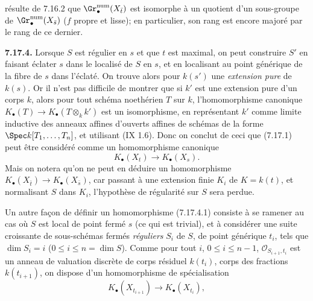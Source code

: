 résulte de 7.16.2 que \(\Gr_\bullet^{\mathrm{num}}(X_{\bar t})\) est isomorphe à un quotient d'un sous-groupe de \(\Gr_\bullet^{\mathrm{num}}(X_{\bar s})\) (\(f\) propre et lisse); en particulier, son rang est encore majoré par le rang de ce dernier.

\textbf{7.17.4.} Lorsque \(S\) est régulier en \(s\) et que \(t\) est maximal, on peut construire \(S'\) en faisant éclater \(s\) dans le localisé de \(S\) en \(s\), et en localisant au point générique de la fibre de \(s\) dans l'éclaté. On trouve alors pour \(k(s')\) une \emph{extension pure} de \(k(s)\). Or il n'est pas difficile de montrer que si \(k'\) est une extension pure d'un corps \(k\), alors pour tout schéma noethérien \(T\) sur \(k\), l'homomorphisme canonique \(K_\bullet(T)\to K_\bullet(T\otimes_k k')\) est un isomorphisme, en représentant \(k'\) comme limite inductive des anneaux affines d'ouverts affines de schémas de la forme \(\Spec k[T_1,\ldots,T_n]\), et utilisant (IX 1.6). Donc on conclut de ceci que (7.17.1) peut être considéré comme un homomorphisme canonique
\begin{equation}\tag{7.17.4.1}
  K_\bullet(X_t)\longrightarrow K_\bullet(X_s).
\end{equation}
Mais on notera qu'on ne peut en déduire un homomorphisme \(K_\bullet(X_{\bar t})\to K_\bullet(X_{\bar s})\), car passant à une extension finie \(K_i\) de \(K=k(t)\), et normalisant \(S\) dans \(K_i\), l'hypothèse de régularité sur \(S\) sera perdue.

Un autre façon de définir un homomorphisme (7.17.4.1) consiste à se ramener au cas où \(S\) est local de point fermé \(s\) (ce qui est trivial), et à considérer une suite croissante de sous-schémas fermés \emph{réguliers} \(S_i\) de \(S\), de point générique \(t_i\), tels que \(\dim S_i=i\) (\(0\leq i\leq n=\dim S\)). Comme pour tout \(i\), \(0\leq i\leq n-1\), \(\mathcal O_{S_{i+1},t_i}\) est un anneau de valuation discrète de corps résiduel \(k(t_i)\), corps des fractions \(k(t_{i+1})\), on dispose d'un homomorphisme de spécialisation
\[
  K_\bullet(X_{t_{i+1}})\longrightarrow K_\bullet(X_{t_i}),
\]
